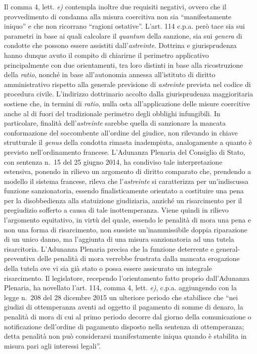 \documentclass[12pt,it,a4paper,]{report}
\begin{document}
Il comma 4, lett. \emph{e)} contempla inoltre due requisiti negativi,
ovvero che il provvedimento di condanna alla misura coercitiva non sia
``manifestamente iniquo'' e che non ricorrano ``ragioni ostative''.
L'art. 114 c.p.a. però tace sia sui parametri in base ai quali calcolare
il \emph{quantum} della sanzione, sia sui \emph{genera} di condotte che
possono essere assistiti dall'\emph{astreinte}. Dottrina e
giurisprudenza hanno dunque avuto il compito di chiarirne il perimetro
applicativo principalmente con due orientamenti, tra loro distinti in
base alla ricostruzione della \emph{ratio}, nonché in base all'autonomia
annessa all'istituto di diritto amministrativo rispetto alla generale
previsione di \emph{astreinte} prevista nel codice di procedura civile.
L'indirizzo dottrinario accolto dalla giurisprudenza maggioritaria
sostiene che, in termini di \emph{ratio}, nulla osta all'applicazione
delle misure coercitive anche al di fuori del tradizionale perimetro
degli obblighi infungibili. In particolare, finalità
dell'\emph{astreinte} sarebbe quella di sanzionare la mancata
conformazione del soccombente all'ordine del giudice, non rilevando in
chiave strutturale il \emph{genus} della condotta rimasta inadempiuta,
analogamente a quanto è previsto nell'ordinamento francese. L'Adunanza
Plenaria del Consiglio di Stato, con sentenza n.~15 del 25 giugno 2014,
ha condiviso tale interpretazione estensiva, ponendo in rilievo un
argomento di diritto comparato che, prendendo a modello il sistema
francese, rileva che l'\emph{astreinte} si caratterizza per
un'indiscussa funzione sanzionatoria, essendo finalisticamente orientato
a costituire una pena per la disobbedienza alla statuizione giudiziaria,
anziché un risarcimento per il pregiudizio sofferto a causa di tale
inottemperanza. Viene quindi in rilievo l'argomento equitativo, in virtù
del quale, essendo le penalità di mora una pena e non una forma di
risarcimento, non sussiste un'inammissibile doppia riparazione di un
unico danno, ma l'aggiunta di una misura sanzionatoria ad una tutela
risarcitoria. L'Adunanza Plenaria precisa che la funzione deterrente e
general-preventiva delle penalità di mora verrebbe frustrata dalla
mancata erogazione della tutela ove vi sia già stato o possa essere
assicurato un integrale risarcimento. Il legislatore, recependo
l'orientamento fatto proprio dall'Adunanza Plenaria, ha novellato l'art.
114, comma 4, lett. \emph{e)}, c.p.a. aggiungendo con la legge n.~208
del 28 dicembre 2015 un ulteriore periodo che stabilisce che ``nei
giudizi di ottemperanza aventi ad oggetto il pagamento di somme di
denaro, la penalità di mora di cui al primo periodo decorre dal giorno
della comunicazione o notificazione dell'ordine di pagamento disposto
nella sentenza di ottemperanza; detta penalità non può considerarsi
manifestamente iniqua quando è stabilita in misura pari agli interessi
legali''.
\end{document}
